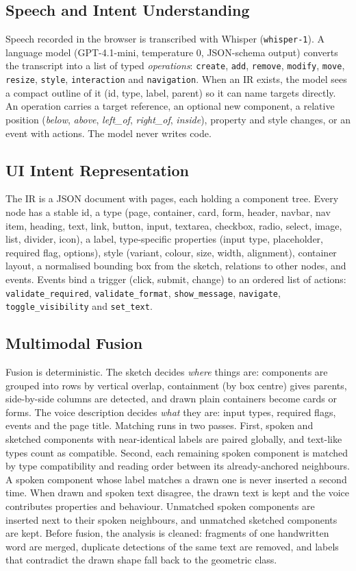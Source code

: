 \subsection{Speech and Intent Understanding}
Speech recorded in the browser is transcribed with Whisper (\texttt{whisper-1}). A language model (GPT-4.1-mini, temperature 0, JSON-schema output) converts the transcript into a list of typed \emph{operations}: \texttt{create}, \texttt{add}, \texttt{remove}, \texttt{modify}, \texttt{move}, \texttt{resize}, \texttt{style}, \texttt{interaction} and \texttt{navigation}. When an IR exists, the model sees a compact outline of it (id, type, label, parent) so it can name targets directly. An operation carries a target reference, an optional new component, a relative position (\emph{below}, \emph{above}, \emph{left\_of}, \emph{right\_of}, \emph{inside}), property and style changes, or an event with actions. The model never writes code.

\subsection{UI Intent Representation}
The IR is a JSON document with pages, each holding a component tree. Every node has a stable id, a type (page, container, card, form, header, navbar, nav item, heading, text, link, button, input, textarea, checkbox, radio, select, image, list, divider, icon), a label, type-specific properties (input type, placeholder, required flag, options), style (variant, colour, size, width, alignment), container layout, a normalised bounding box from the sketch, relations to other nodes, and events. Events bind a trigger (click, submit, change) to an ordered list of actions: \texttt{validate\_required}, \texttt{validate\_format}, \texttt{show\_message}, \texttt{navigate}, \texttt{toggle\_visibility} and \texttt{set\_text}.

\subsection{Multimodal Fusion}
Fusion is deterministic. The sketch decides \emph{where} things are: components are grouped into rows by vertical overlap, containment (by box centre) gives parents, side-by-side columns are detected, and drawn plain containers become cards or forms. The voice description decides \emph{what} they are: input types, required flags, events and the page title. Matching runs in two passes. First, spoken and sketched components with near-identical labels are paired globally, and text-like types count as compatible. Second, each remaining spoken component is matched by type compatibility and reading order between its already-anchored neighbours. A spoken component whose label matches a drawn one is never inserted a second time. When drawn and spoken text disagree, the drawn text is kept and the voice contributes properties and behaviour. Unmatched spoken components are inserted next to their spoken neighbours, and unmatched sketched components are kept. Before fusion, the analysis is cleaned: fragments of one handwritten word are merged, duplicate detections of the same text are removed, and labels that contradict the drawn shape fall back to the geometric class.

